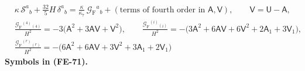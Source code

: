 \documentclass[
  10pt,
]{article}
\begin{document}
\[
\begin{aligned}
&\kappa\,\mathcal{S}^a{}_b + \frac{32}{5}H\,\delta^a{}_b = \frac{\kappa}{\kappa_7}\,\mathcal{G}_{\mathrm{F}}{}^a{}_b
 + (\text{terms of fourth order in } \mathsf{A}, \mathsf{V}),\qquad \mathsf{V} = \mathsf{U} - \mathsf{A},\\
&\frac{\mathcal{G}_{\mathrm{F}}{}^{(4)}{}_{(4)}}{H^2} = -3\big(\mathsf{A}^2 + 3\mathsf{A}\mathsf{V} + \mathsf{V}^2\big),\qquad
 \frac{\mathcal{G}_{\mathrm{F}}{}^{(i)}{}_{(i)}}{H^2} = -\big(3\mathsf{A}^2 + 6\mathsf{A}\mathsf{V} + 6\mathsf{V}^2 + 2\mathsf{A}_1 + 3\mathsf{V}_1\big),\\
&\frac{\mathcal{G}_{\mathrm{F}}{}^{(r)}{}_{(r)}}{H^2} = -\big(6\mathsf{A}^2 + 6\mathsf{A}\mathsf{V} + 3\mathsf{V}^2 + 3\mathsf{A}_1 + 2\mathsf{V}_1\big)
\end{aligned} \tag{FE-71}
\] \textbf{Symbols in (FE-71).}
\end{document}
